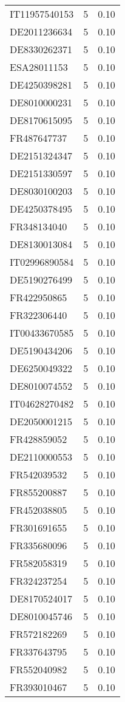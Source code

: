 \begin{table*}[htbp]
\begin{tabular}{lrr}
IT11957540153 & 5 & 0.10 \\
DE2011236634 & 5 & 0.10 \\
DE8330262371 & 5 & 0.10 \\
ESA28011153 & 5 & 0.10 \\
DE4250398281 & 5 & 0.10 \\
DE8010000231 & 5 & 0.10 \\
DE8170615095 & 5 & 0.10 \\
FR487647737 & 5 & 0.10 \\
DE2151324347 & 5 & 0.10 \\
DE2151330597 & 5 & 0.10 \\
DE8030100203 & 5 & 0.10 \\
DE4250378495 & 5 & 0.10 \\
FR348134040 & 5 & 0.10 \\
DE8130013084 & 5 & 0.10 \\
IT02996890584 & 5 & 0.10 \\
DE5190276499 & 5 & 0.10 \\
FR422950865 & 5 & 0.10 \\
FR322306440 & 5 & 0.10 \\
IT00433670585 & 5 & 0.10 \\
DE5190434206 & 5 & 0.10 \\
DE6250049322 & 5 & 0.10 \\
DE8010074552 & 5 & 0.10 \\
IT04628270482 & 5 & 0.10 \\
DE2050001215 & 5 & 0.10 \\
FR428859052 & 5 & 0.10 \\
DE2110000553 & 5 & 0.10 \\
FR542039532 & 5 & 0.10 \\
FR855200887 & 5 & 0.10 \\
FR452038805 & 5 & 0.10 \\
FR301691655 & 5 & 0.10 \\
FR335680096 & 5 & 0.10 \\
FR582058319 & 5 & 0.10 \\
FR324237254 & 5 & 0.10 \\
DE8170524017 & 5 & 0.10 \\
DE8010045746 & 5 & 0.10 \\
FR572182269 & 5 & 0.10 \\
FR337643795 & 5 & 0.10 \\
FR552040982 & 5 & 0.10 \\
FR393010467 & 5 & 0.10 \\

\end{tabular}
\end{table*}
